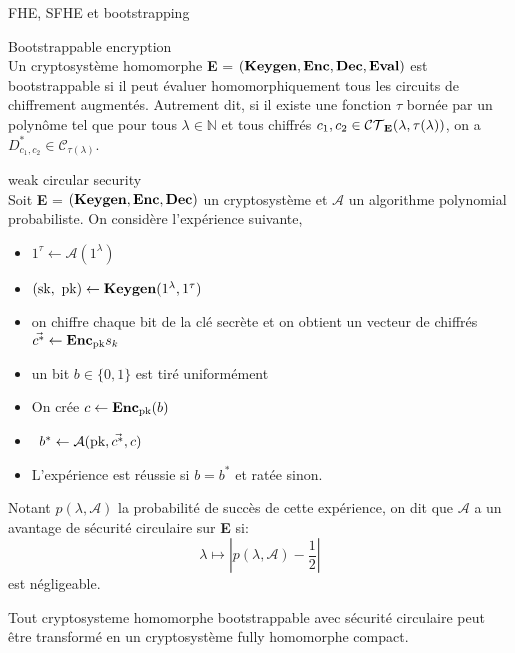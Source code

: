 \begin{section}{FHE, SFHE et bootstrapping}
\begin{definition}{Bootstrappable encryption} \\
Un cryptosystème homomorphe
\textbf{E} = $(\text{\textbf{Keygen}}, \text{\textbf{Enc}}, \text{\textbf{Dec}}, \text{\textbf{Eval}})$
est bootstrappable si il peut évaluer homomorphiquement tous les circuits 
de chiffrement augmentés. Autrement dit, si il existe une fonction $\tau$
bornée par un polynôme tel que pour tous $\lambda \in \mathbb{N}$ et tous
chiffrés  $c_1, c_2 \in \mathcal{CT}_{\text{\textbf{E}}}(\lambda, \tau(\lambda))$, on a
$D^*_{c_1,c_2} \in \mathcal{C}_{\tau(\lambda)}$.
\end{definition}

\begin{definition}{weak circular security} \\
\label{def:circular}
Soit \textbf{E} = $(\text{\textbf{Keygen}}, \text{\textbf{Enc}}, \text{\textbf{Dec}})$ un cryptosystème et $\mathcal{A}$ un
algorithme polynomial probabiliste. 
On considère l'expérience suivante, 
\begin{itemize}
\item $1^\tau \leftarrow \mathcal{A}(1^\lambda)$ 
\item $(\sk, \pk) \leftarrow \Keygen(1^\lambda, 1^\tau)$
\item on chiffre chaque bit de la clé secrète et on obtient un vecteur de
chiffrés $\vec{c^*} \leftarrow \text{\textbf{Enc}}_{\text{pk}}{s_k}$
\item un bit $b\in \{0,1\}$ est tiré uniformément
\item On crée $c \leftarrow \text{\textbf{Enc}}_{\text{pk}}(b)$ 
\item $b^* \leftarrow \mathcal{A}(\text{pk}, \vec{c^*}, c)$
\item L'expérience est réussie si $b = b^*$ et ratée sinon.
\end{itemize}
Notant $p(\lambda, \mathcal{A})$ la probabilité de succès de cette expérience, on dit
que $\mathcal{A}$ a un avantage de sécurité circulaire sur \textbf{E} si:
\[\lambda \mapsto |p(\lambda, \mathcal{A}) - \frac{1}{2}| \]
est négligeable.
\end{definition}

\begin{thm}
Tout cryptosysteme homomorphe bootstrappable avec sécurité circulaire peut être transformé en un 
cryptosystème fully homomorphe compact.
\end{thm}
\end{section}
